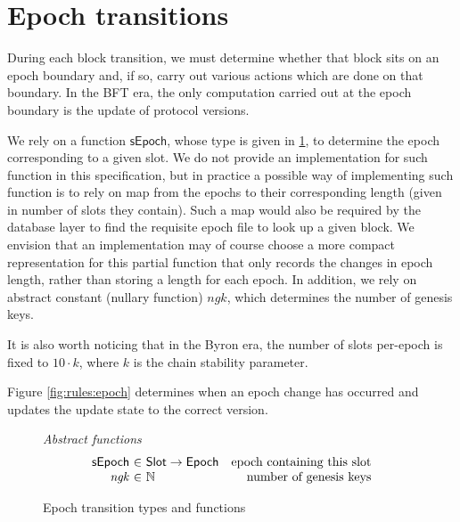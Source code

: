 \documentclass[11pt,a4paper]{article}
\newcommand{\var}[1]{\mathit{#1}}
\newcommand{\fun}[1]{\mathsf{#1}}
\newcommand{\type}[1]{\mathsf{#1}}
\newcommand{\totalf}{\to}
\newcommand{\Slot}{\type{Slot}}
\begin{document}
\clearpage

\section{Epoch transitions}

\newcommand{\Epoch}{\type{Epoch}}

\newcommand{\ETState}{\type{ETState}}
\newcommand{\ETEnv}{\type{ETEnv}}

\newcommand{\sepochname}{sEpoch}
\newcommand{\sepoch}[1]{\fun{\sepochname}\ #1}

During each block transition, we must determine whether that block sits on an
epoch boundary and, if so, carry out various actions which are done on that
boundary. In the BFT era, the only computation carried out at the epoch boundary
is the update of protocol versions.

We rely on a function $\fun{\sepochname}$, whose type is given in
\cref{fig:defs:epoch}, to determine the epoch corresponding to a given slot.
%
We do not provide an implementation for such function in this specification,
but in practice a possible way of implementing such function is to rely on map
from the epochs to their corresponding length (given in number of slots they
contain). Such a map would also be required by the database layer to find the
requisite epoch file to look up a given block. We envision that an
implementation may of course choose a more compact representation for this
partial function that only records the changes in epoch length, rather than
storing a length for each epoch.
%
In addition, we rely on abstract constant (nullary function) $\var{ngk}$, which
determines the number of genesis keys.

It is also worth noticing that in the Byron era, the number of slots per-epoch
is fixed to $10 \cdot k$, where $k$ is the chain stability parameter.

Figure \ref{fig:rules:epoch} determines when an epoch change has occurred and
updates the update state to the correct version.

\begin{figure}[ht]
  \emph{Abstract functions}
  \begin{equation*}
    \begin{array}{r@{~\in~}lr}
      \fun{\sepochname}
      & \Slot \totalf \Epoch
      & \text{epoch containing this slot} \\
      \var{ngk} & \mathbb{N} & \text{number of genesis keys}\\
    \end{array}
  \end{equation*}

  \caption{Epoch transition types and functions}
  \label{fig:defs:epoch}
\end{figure}
\end{document}
